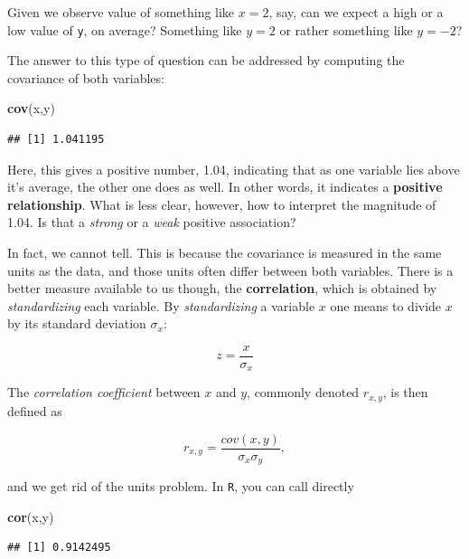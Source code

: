 \documentclass[]{book}
\newenvironment{Shaded}{\begin{snugshade}}{\end{snugshade}}
\newcommand{\KeywordTok}[1]{\textcolor[rgb]{0.13,0.29,0.53}{\textbf{#1}}}
\newcommand{\NormalTok}[1]{#1}
\newenvironment{note}{\begin{tcolorbox}[colback=blue!5!white,colframe=blue!75!black,title=\textbf{Note:}]}{\end{tcolorbox}}
\theoremstyle{definition}
\theoremstyle{definition}
\theoremstyle{definition}
\theoremstyle{remark}
\begin{document}
\begin{note}
Given we observe value of something like \(x=2\), say, can we expect a
high or a low value of \texttt{y}, on average? Something like \(y=2\) or
rather something like \(y=-2\)?
\end{note}

 The answer to this type of question can be addressed by computing the
covariance of both variables:

\begin{Shaded}
\begin{Highlighting}[]
\KeywordTok{cov}\NormalTok{(x,y)  }
\end{Highlighting}
\end{Shaded}

\begin{verbatim}
## [1] 1.041195
\end{verbatim}

Here, this gives a positive number, 1.04, indicating that as one
variable lies above it's average, the other one does as well. In other
words, it indicates a \textbf{positive relationship}. What is less
clear, however, how to interpret the magnitude of 1.04. Is that a
\emph{strong} or a \emph{weak} positive association?

In fact, we cannot tell. This is because the covariance is measured in
the same units as the data, and those units often differ between both
variables. There is a better measure available to us though, the
\textbf{correlation}, which is obtained by \emph{standardizing} each
variable. By \emph{standardizing} a variable \(x\) one means to divide
\(x\) by its standard deviation \(\sigma_x\):

\[
z = \frac{x}{\sigma_x}
\]

The \emph{correlation coefficient} between \(x\) and \(y\), commonly
denoted \(r_{x,y}\), is then defined as

\[
r_{x,y} = \frac{cov(x,y)}{\sigma_x \sigma_y},
\]

and we get rid of the units problem. In \texttt{R}, you can call
directly

\begin{Shaded}
\begin{Highlighting}[]
\KeywordTok{cor}\NormalTok{(x,y)}
\end{Highlighting}
\end{Shaded}

\begin{verbatim}
## [1] 0.9142495
\end{verbatim}
\end{document}
